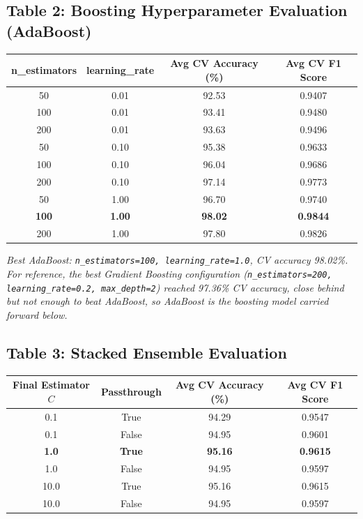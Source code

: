 \documentclass[12pt,a4paper]{article}
\begin{document}
\subsection*{Table 2: Boosting Hyperparameter Evaluation (AdaBoost)}
\begin{tabular}{ccc c}
\toprule
n\_estimators & learning\_rate & Avg CV Accuracy (\%) & Avg CV F1 Score \\
\midrule
50  & 0.01 & 92.53 & 0.9407 \\
100 & 0.01 & 93.41 & 0.9480 \\
200 & 0.01 & 93.63 & 0.9496 \\
50  & 0.10 & 95.38 & 0.9633 \\
100 & 0.10 & 96.04 & 0.9686 \\
200 & 0.10 & 97.14 & 0.9773 \\
50  & 1.00 & 96.70 & 0.9740 \\
\textbf{100} & \textbf{1.00} & \textbf{98.02} & \textbf{0.9844} \\
200 & 1.00 & 97.80 & 0.9826 \\
\bottomrule
\end{tabular}
\vspace{2mm}

\textit{Best AdaBoost: \texttt{n\_estimators=100, learning\_rate=1.0}, CV accuracy 98.02\%.
For reference, the best Gradient Boosting configuration
(\texttt{n\_estimators=200, learning\_rate=0.2, max\_depth=2}) reached 97.36\% CV accuracy,
close behind but not enough to beat AdaBoost, so AdaBoost is the boosting model carried
forward below.}

\subsection*{Table 3: Stacked Ensemble Evaluation}
\begin{tabular}{ccc c}
\toprule
Final Estimator $C$ & Passthrough & Avg CV Accuracy (\%) & Avg CV F1 Score \\
\midrule
0.1  & True  & 94.29 & 0.9547 \\
0.1  & False & 94.95 & 0.9601 \\
\textbf{1.0}  & \textbf{True}  & \textbf{95.16} & \textbf{0.9615} \\
1.0  & False & 94.95 & 0.9597 \\
10.0 & True  & 95.16 & 0.9615 \\
10.0 & False & 94.95 & 0.9597 \\
\bottomrule
\end{tabular}
\vspace{2mm}
\end{document}
